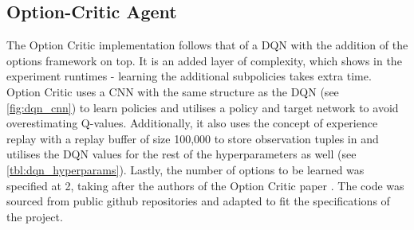 \documentclass[notitlepage,a4paper,11pt]{article}
\begin{document}
\subsection{Option-Critic Agent}\label{oc_experiment}
The Option Critic implementation follows that of a DQN with the addition of the options framework on top. It is an added layer of complexity, which shows in the experiment runtimes - learning the additional subpolicies takes extra time. Option Critic uses a CNN with the same structure as the DQN (see \ref{fig:dqn_cnn}) to learn policies and utilises a policy and target network to avoid overestimating Q-values. Additionally, it also uses the concept of experience replay with a replay buffer of size 100,000 to store observation tuples in and utilises the DQN values for the rest of the hyperparameters as well (see \ref{tbl:dqn_hyperparams}). Lastly, the number of options to be learned was specified at 2, taking after the authors of the Option Critic paper \cite{bacon2017option}. The code was sourced from public github repositories \cite{oc_github} and adapted to fit the specifications of the project.
\end{document}
